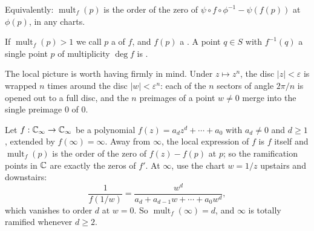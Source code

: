\documentclass[a4paper]{scrartcl}
\newcommand{\Cinf}{\C_\infty}
\newcommand{\mult}{\operatorname{mult}}
\begin{document}
Equivalently: $\mult_f(p)$ is the order of the zero of $\psi\circ f\circ\phi^{-1} - \psi(f(p))$
at $\phi(p)$, in any charts.

\begin{definition}
	If $\mult_f(p) > 1$ we call $p$ a  of $f$, and $f(p)$ a
	. A point $q \in S$ with $f^{-1}(q)$ a single point $p$ of
	multiplicity $\deg f$ is .
\end{definition}

The local picture is worth having firmly in mind. Under $z \mapsto z^n$, the disc
$|z|<\varepsilon$ is wrapped $n$ times around the disc $|w| < \varepsilon^n$: each of the
$n$ sectors of angle $2\pi/n$ is opened out to a full disc, and the $n$ preimages of a
point $w \neq 0$ merge into the single preimage $0$ of $0$.

\begin{center}
\end{center}

\begin{example}\label{ex:polymult}
	Let $f : \Cinf \to \Cinf$ be a polynomial $f(z) = a_dz^d + \cdots + a_0$ with
	$a_d \neq 0$ and $d \geq 1$, extended by $f(\infty) = \infty$. Away from $\infty$, the
	local expression of $f$ is $f$ itself and $\mult_f(p)$ is the order of the zero of
	$f(z) - f(p)$ at $p$; so the ramification points in $\mathbb{C}$ are exactly the zeros of $f'$.
	At $\infty$, use the chart $w = 1/z$ upstairs and downstairs:
	$$
	\frac{1}{f(1/w)} = \frac{w^d}{a_d + a_{d-1}w+\cdots+a_0w^d},
	$$
	which vanishes to order $d$ at $w = 0$. So $\mult_f(\infty) = d$, and $\infty$ is
	totally ramified whenever $d \geq 2$.
\end{example}
\end{document}
